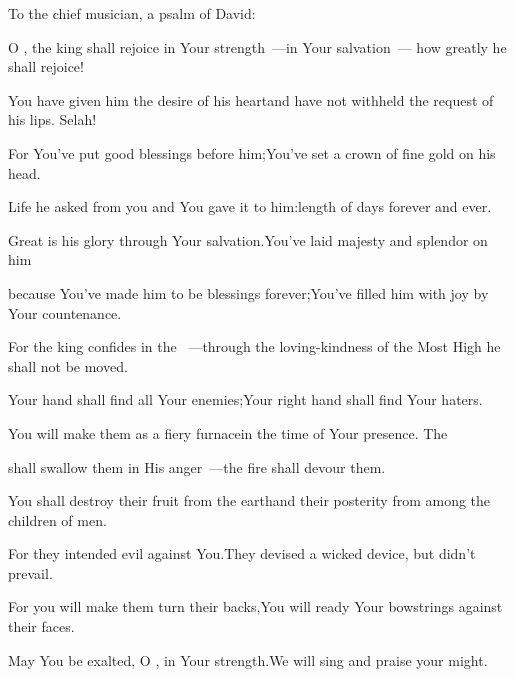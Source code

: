 
\begin{inparaenum}
   To the chief musician, a psalm of David:\smallskip%
  
  \pa {} O \lord, the king shall rejoice in Your strength~---\pa in Your salvation~--- how greatly he shall rejoice!%
  
  \pa {} You have given him the desire of his heart\pa and have not withheld the request of his lips. Selah!%
  
  \pb {} For You've put good blessings before him;\pa You've set a crown of fine gold on his head.%
  
   Life he asked from you and You gave it to him:\pa length of days forever and ever.%
  
  \pa {} Great is his glory through Your salvation.\pa You've laid majesty and splendor on him%
  
  \pa {} because You've made him to be blessings forever;\pa You've filled him with joy by Your countenance.%
  
  \pb {} For the king confides in the \lord~---\pa through the loving-kindness of the Most High he shall not be moved.%
  
  \pa {} Your hand shall find all Your enemies;\pa Your right hand shall find Your haters.%
  
  \pa {} You will make them as a fiery furnace\pa in the time of Your presence. The \lord%
  
  \pb shall swallow them in His anger~---\pa the fire shall devour them.%
  
  \pa {} You shall destroy their fruit from the earth\pa and their posterity from among the children of men.%
  
  \pb {} For they intended evil against You.\pa They devised a wicked device, but didn't prevail.%
  
  \pa {} For you will make them turn their backs,\pa You will ready Your bowstrings against their faces.%
  
  \pa {} May You be exalted, O \lord, in Your strength.\pa We will sing and praise your might.%
\end{inparaenum}
